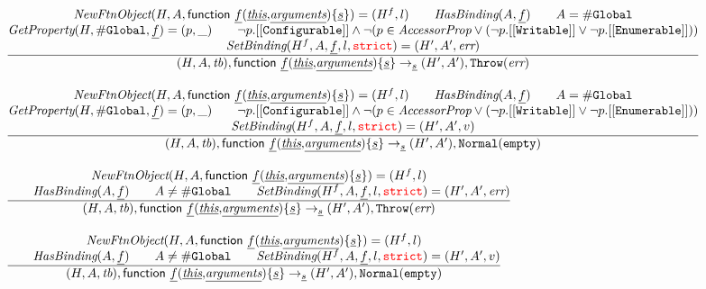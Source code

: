 \documentclass[a4paper, leqno]{amsart}
\newcommand{\rulesep}{\quad\quad}
\newcommand{\stmt}{s}
\newcommand{\ir}[1]{\ensuremath{\underline{#1}}}
\def\inred{\color{red}}
\newcommand{\strict}{{\inred\tt strict}}
\newcommand{\tb}{\emph{tb}}
\newcommand{\err}{\emph{err}}
\renewcommand{\lg}{{\tt \#Global}}
\newcommand{\hf}[1]{\emph{#1}}
\newcommand{\void}{{\tt Normal}({\tt empty})}
\newcommand{\error}{\ensuremath{{\tt Throw}(\err)}}
\newcommand{\state}{\ensuremath{(H,A,\tb)}}
\newcommand{\resp}{\ensuremath{(H',A')}}
\newcommand{\irfndecl}{\ensuremath{{\sf function} \ \ir{f} {\tt(}\ir{\emph{this}}{\tt,}\ir{\emph{arguments}}{\tt) \{} \ir\stmt {\tt\}}}}
\def\inred{\color{red}}
\begin{document}
\[\begin{array}{l@{~~}l@{~~}ll}
\frac{\begin{matrix}
\hf{NewFtnObject}(H,A,\irfndecl) = (H^f, l)
\rulesep
\hf{HasBinding}(A, \ir{f})
\rulesep A = \lg\\
\hf{GetProperty}(H,\lg,\ir{f}) = (p, \_)
\rulesep
\neg p.{\tt[[Configurable]]}
\wedge \neg (p \in \emph{AccessorProp} \vee (\neg p.{\tt[[Writable]]} \vee \neg p.{\tt[[Enumerable]]}))
\\
\hf{SetBinding}(H^f, A, \ir{f}, l, \strict) = (H', A', \err)
\end{matrix}}{\begin{matrix}
\state, \irfndecl \rightarrow_{\ir\stmt}\resp, \error
\end{matrix}}\\[2em]

\frac{\begin{matrix}
\hf{NewFtnObject}(H,A,\irfndecl) = (H^f, l)
\rulesep
\hf{HasBinding}(A, \ir{f})
\rulesep A = \lg\\
\hf{GetProperty}(H,\lg,\ir{f}) = (p, \_)
\rulesep
\neg p.{\tt[[Configurable]]}
\wedge \neg (p \in \emph{AccessorProp} \vee (\neg p.{\tt[[Writable]]} \vee \neg p.{\tt[[Enumerable]]}))
\\
\hf{SetBinding}(H^f, A, \ir{f}, l, \strict) = (H', A', v)
\end{matrix}}{\begin{matrix}
\state, \irfndecl \rightarrow_{\ir\stmt}\resp, \void
\end{matrix}}\\[2em]

\frac{\begin{matrix}
\hf{NewFtnObject}(H,A,\irfndecl) = (H^f, l)\\
\rulesep
\hf{HasBinding}(A, \ir{f})
\rulesep
A \not= \lg
\rulesep
\hf{SetBinding}(H^f, A, \ir{f}, l, \strict) = (H', A', \err)
\end{matrix}}{\begin{matrix}
\state, \irfndecl \rightarrow_{\ir\stmt}
\resp, \error
\end{matrix}}\\[2em]
\frac{\begin{matrix}
\hf{NewFtnObject}(H,A,\irfndecl) = (H^f, l)\\
\rulesep
\hf{HasBinding}(A, \ir{f})
\rulesep
A \not= \lg
\rulesep
\hf{SetBinding}(H^f, A, \ir{f}, l, \strict) = (H', A', v)
\end{matrix}}{\begin{matrix}
\state, \irfndecl \rightarrow_{\ir\stmt} \resp, \void
\end{matrix}}\\[2em]



\end{array}\]
\end{document}
